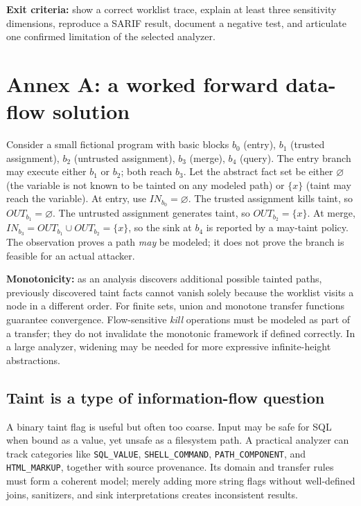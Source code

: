 \documentclass[
  letterpaper,
]{article}
\begin{document}
\textbf{Exit criteria:} show a correct worklist trace, explain at least
three sensitivity dimensions, reproduce a SARIF result, document a
negative test, and articulate one confirmed limitation of the selected
analyzer.

\section{Annex A: a worked forward data-flow
solution}\label{annex-a-a-worked-forward-data-flow-solution}

Consider a small fictional program with basic blocks \(b_0\) (entry),
\(b_1\) (trusted assignment), \(b_2\) (untrusted assignment), \(b_3\)
(merge), \(b_4\) (query). The entry branch may execute either \(b_1\) or
\(b_2\); both reach \(b_3\). Let the abstract fact set be either
\(\varnothing\) (the variable is not known to be tainted on any modeled
path) or \(\{x\}\) (taint may reach the variable). At entry, use
\(IN_{b_0}=\varnothing\). The trusted assignment kills taint, so
\(OUT_{b_1}=\varnothing\). The untrusted assignment generates taint, so
\(OUT_{b_2}=\{x\}\). At merge,
\(IN_{b_3}=OUT_{b_1}\cup OUT_{b_2}=\{x\}\), so the sink at \(b_4\) is
reported by a may-taint policy. The observation proves a path \emph{may}
be modeled; it does not prove the branch is feasible for an actual
attacker.

\textbf{Monotonicity:} as an analysis discovers additional possible
tainted paths, previously discovered taint facts cannot vanish solely
because the worklist visits a node in a different order. For finite
sets, union and monotone transfer functions guarantee convergence.
Flow-sensitive \emph{kill} operations must be modeled as part of a
transfer; they do not invalidate the monotonic framework if defined
correctly. In a large analyzer, widening may be needed for more
expressive infinite-height abstractions.

\subsection{Taint is a type of information-flow
question}\label{taint-is-a-type-of-information-flow-question}

A binary taint flag is useful but often too coarse. Input may be safe
for SQL when bound as a value, yet unsafe as a filesystem path. A
practical analyzer can track categories like \texttt{SQL\_VALUE},
\texttt{SHELL\_COMMAND}, \texttt{PATH\_COMPONENT}, and
\texttt{HTML\_MARKUP}, together with source provenance. Its domain and
transfer rules must form a coherent model; merely adding more string
flags without well-defined joins, sanitizers, and sink interpretations
creates inconsistent results.
\end{document}
